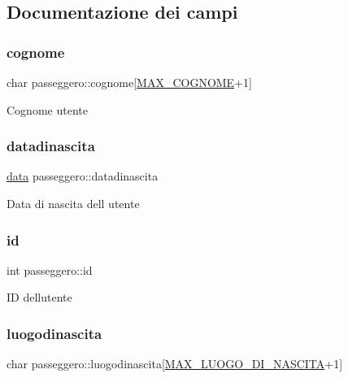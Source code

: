 \subsection{Documentazione dei campi}
\mbox{\label{structpasseggero_af373fa9cc3d35c76a7ca974f020659a1}} 
\subsubsection{\texorpdfstring{cognome}{cognome}}
{\footnotesize\ttfamily char passeggero\+::cognome\mbox{[}\hyperlink{define_8h_ae2433f35c071964de3e67f504e0f28aa}{M\+A\+X\+\_\+\+C\+O\+G\+N\+O\+ME}+1\mbox{]}}

Cognome utente \mbox{\label{structpasseggero_aa4bbbed19de9d525383a3fa5b1f30b39}} 
\subsubsection{\texorpdfstring{datadinascita}{datadinascita}}
{\footnotesize\ttfamily \hyperlink{structdata}{data} passeggero\+::datadinascita}

Data di nascita dell\textquotesingle{} utente \mbox{\label{structpasseggero_ac61046ccd664c38ce4edfeca6da85775}} 
\subsubsection{\texorpdfstring{id}{id}}
{\footnotesize\ttfamily int passeggero\+::id}

ID dell\textquotesingle{}utente \mbox{\label{structpasseggero_add5f60da89db3e535766d7da5a8d3c89}} 
\subsubsection{\texorpdfstring{luogodinascita}{luogodinascita}}
{\footnotesize\ttfamily char passeggero\+::luogodinascita\mbox{[}\hyperlink{define_8h_ab6af835f1c2ed602bdca789eec14638a}{M\+A\+X\+\_\+\+L\+U\+O\+G\+O\+\_\+\+D\+I\+\_\+\+N\+A\+S\+C\+I\+TA}+1\mbox{]}}

